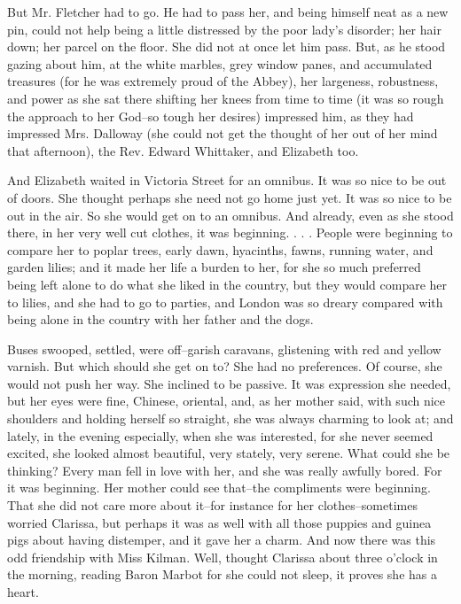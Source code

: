 \documentclass[lang=cn,10pt]{elegantbook}
\begin{document}
But Mr. Fletcher had to go.  He had to pass her, and being himself
neat as a new pin, could not help being a little distressed by the
poor lady's disorder; her hair down; her parcel on the floor.  She
did not at once let him pass.  But, as he stood gazing about him,
at the white marbles, grey window panes, and accumulated treasures
(for he was extremely proud of the Abbey), her largeness,
robustness, and power as she sat there shifting her knees from time
to time (it was so rough the approach to her God--so tough her
desires) impressed him, as they had impressed Mrs. Dalloway (she
could not get the thought of her out of her mind that afternoon),
the Rev. Edward Whittaker, and Elizabeth too.

And Elizabeth waited in Victoria Street for an omnibus.  It was so
nice to be out of doors.  She thought perhaps she need not go home
just yet.  It was so nice to be out in the air.  So she would get
on to an omnibus.  And already, even as she stood there, in her
very well cut clothes, it was beginning. . . .  People were
beginning to compare her to poplar trees, early dawn, hyacinths,
fawns, running water, and garden lilies; and it made her life a
burden to her, for she so much preferred being left alone to do
what she liked in the country, but they would compare her to
lilies, and she had to go to parties, and London was so dreary
compared with being alone in the country with her father and the
dogs.

Buses swooped, settled, were off--garish caravans, glistening with
red and yellow varnish.  But which should she get on to?  She had
no preferences.  Of course, she would not push her way.  She
inclined to be passive.  It was expression she needed, but her eyes
were fine, Chinese, oriental, and, as her mother said, with such
nice shoulders and holding herself so straight, she was always
charming to look at; and lately, in the evening especially, when
she was interested, for she never seemed excited, she looked almost
beautiful, very stately, very serene.  What could she be thinking?
Every man fell in love with her, and she was really awfully bored.
For it was beginning.  Her mother could see that--the compliments
were beginning.  That she did not care more about it--for instance
for her clothes--sometimes worried Clarissa, but perhaps it was as
well with all those puppies and guinea pigs about having distemper,
and it gave her a charm.  And now there was this odd friendship
with Miss Kilman.  Well, thought Clarissa about three o'clock in
the morning, reading Baron Marbot for she could not sleep, it
proves she has a heart.
\end{document}

